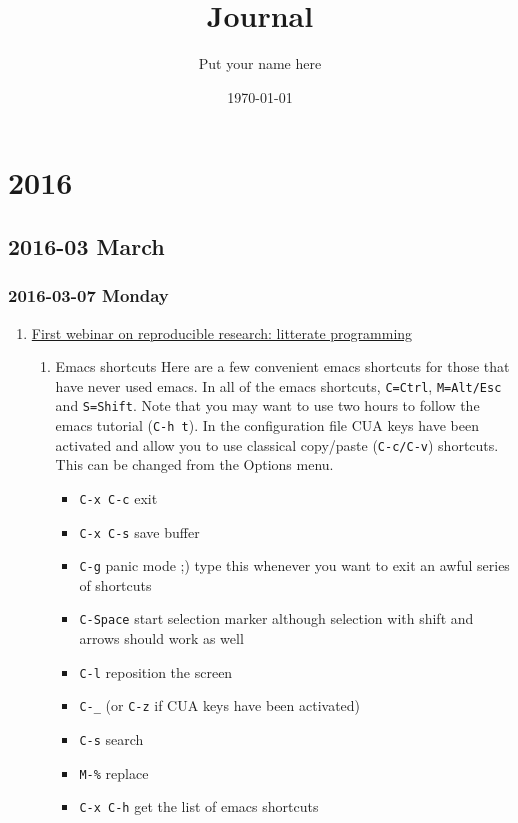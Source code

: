 \documentclass[11pt]{article}
\author{Put your name here}
\date{\today}
\title{Journal}
\begin{document}
\maketitle
\tableofcontents


\section{2016}
\label{sec:orge331be9}
\subsection{2016-03 March}
\label{sec:orgb54a22a}
\subsubsection{2016-03-07 Monday}
\label{sec:orgd729998}
\begin{enumerate}
\item \href{https://github.com/alegrand/RR\_webinars/blob/master/1\_replicable\_article\_laboratory\_notebook/index.org}{First webinar on reproducible research: litterate programming}
\label{sec:org16e9dad}
\begin{enumerate}
\item Emacs shortcuts
\label{sec:org2a72a70}
Here are a few convenient emacs shortcuts for those that have never
used emacs. In all of the emacs shortcuts, \texttt{C=Ctrl}, \texttt{M=Alt/Esc} and
\texttt{S=Shift}.  Note that you may want to use two hours to follow the emacs
tutorial (\texttt{C-h t}). In the configuration file CUA keys have been
activated and allow you to use classical copy/paste (\texttt{C-c/C-v})
shortcuts. This can be changed from the Options menu.
\begin{itemize}
\item \texttt{C-x C-c} exit
\item \texttt{C-x C-s} save buffer
\item \texttt{C-g} panic mode ;) type this whenever you want to exit an awful
series of shortcuts
\item \texttt{C-Space} start selection marker although selection with shift and
arrows should work as well
\item \texttt{C-l} reposition the screen
\item \texttt{C-\_} (or \texttt{C-z} if CUA keys have been activated)
\item \texttt{C-s} search
\item \texttt{M-\%} replace
\item \texttt{C-x C-h} get the list of emacs shortcuts

\end{itemize}
\end{enumerate}
\end{enumerate}
\end{document}
